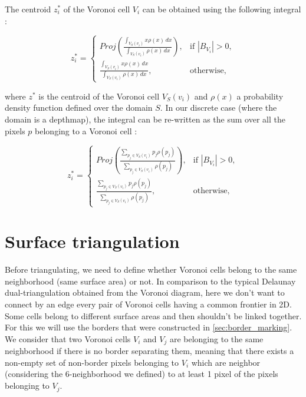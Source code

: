 \documentclass[11pt,fleqn]{book} %
\begin{document}
The centroid $z_i^*$ of the Voronoi cell $V_i$ can be obtained using the following integral :

\begin{equation}
		z_i^* = \begin{cases}
		Proj(\frac{\int_{V_S(v_i)} x\rho(x)\,dx}{\int_{V_S(v_i)} \rho(x)\,dx}) , & \text{if $|B_{V_i}| > 0$}, \\
		\frac{\int_{V_S(v_i)} x\rho(x)\,dx}{\int_{V_S(v_i)} \rho(x)\,dx}, & \text{otherwise}, 
		\end{cases}
\end{equation}

where $z^*$ is the centroid of the Voronoi cell $V_S(v_i)$ and $\rho(x)$ a probability density function defined over the domain $S$.
In our discrete case (where the domain is a depthmap), the integral can be re-written as the sum over all the pixels $p$ belonging to a Voronoi cell : 

\begin{equation}
		z_i^* = \begin{cases}
		Proj(\frac{\sum_{p_j \in V_S(v_i)} p_j\rho(p_j)}{\sum_{p_j \in V_S(v_i)} \rho(p_j)}) , & \text{if $|B_{V_i}| > 0$}, \\
		\frac{\sum_{p_j \in V_S(v_i)} p_j\rho(p_j)}{\sum_{p_j \in V_S(v_i)} \rho(p_j)}, & \text{otherwise}, 
		\end{cases}
\end{equation}

\section{Surface triangulation}
\label{sec:surface_triangulation}
Before triangulating, we need to define whether Voronoi cells belong to the same neighborhood (same surface area) or not. In comparison to the typical Delaunay dual-triangulation obtained from the Voronoi diagram, here we don't want to connect by an edge every pair of Voronoi cells having a common frontier in 2D. Some cells belong to different surface areas and then shouldn't be linked together.
For this we will use the borders that were constructed in \ref{sec:border_marking}.
We consider that two Voronoi cells $V_i$ and $V_j$ are belonging to the same neighborhood if there is no border separating them, meaning that there exists a non-empty set of non-border pixels belonging to $V_i$ which are neighbor (considering the 6-neighborhood we defined) to at least 1 pixel of the pixels belonging to $V_j$.
\end{document}
